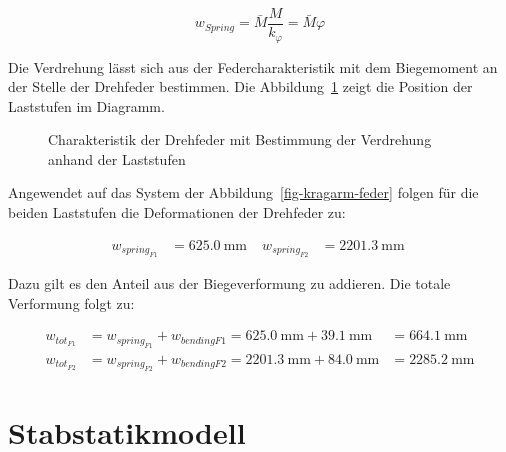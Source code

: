 \documentclass[
  11pt,
  letterpaper,
]{scrreprt}
\begin{document}
\[
w_{Spring} = \bar{M} \frac{M}{k_\varphi} = \bar{M} \varphi
\]

Die Verdrehung lässt sich aus der Federcharakteristik mit dem
Biegemoment an der Stelle der Drehfeder bestimmen. Die
Abbildung~\ref{fig-feder-force} zeigt die Position der Laststufen im
Diagramm.

\begin{figure}[H]


\caption{\label{fig-feder-force}Charakteristik der Drehfeder mit
Bestimmung der Verdrehung anhand der Laststufen}

\end{figure}%

Angewendet auf das System der Abbildung~\ref{fig-kragarm-feder} folgen
für die beiden Laststufen die Deformationen der Drehfeder zu:

$$
\begin{aligned}
w_{spring_{F1}} &= 625.0\ \mathrm{mm} \; 
 &w_{spring_{F2}} &= 2201.3\ \mathrm{mm} \;
\end{aligned}
$$

Dazu gilt es den Anteil aus der Biegeverformung zu addieren. Die totale
Verformung folgt zu:

$$
\begin{aligned}
w_{tot_{F1}} &= w_{spring_{F1}} + w_{bendingF1}  = 625.0\ \mathrm{mm} + 39.1\ \mathrm{mm} &= 664.1\ \mathrm{mm}  
\\[12pt]
w_{tot_{F2}} &= w_{spring_{F2}} + w_{bendingF2}  = 2201.3\ \mathrm{mm} + 84.0\ \mathrm{mm} &= 2285.2\ \mathrm{mm}  
\end{aligned}
$$

\section{Stabstatikmodell}\label{stabstatikmodell}
\end{document}
